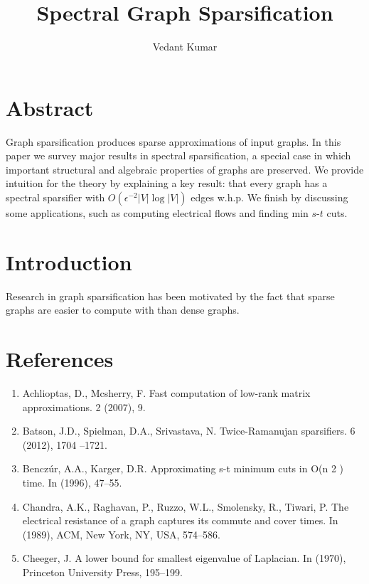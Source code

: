 \documentclass{article}
\title{Spectral Graph Sparsification}
\author{Vedant Kumar}
\begin{document}
\maketitle

\section*{Abstract}

Graph sparsification produces sparse approximations of input graphs.  In
this paper we survey major results in spectral sparsification, a special
case in which important structural and algebraic properties of graphs are
preserved.  We provide intuition for the theory by explaining a key result:
that every graph has a spectral sparsifier with $O(\epsilon^{-2}|V|\log|V|)$
edges w.h.p. We finish by discussing some applications, such as computing
electrical flows and finding min $s$-$t$ cuts.

\section*{Introduction}

Research in graph sparsification has been motivated by the fact that sparse
graphs are easier to compute with than dense graphs. 

\section*{References}

\begin{enumerate}[1.]
    \item Achlioptas, D., Mcsherry, F. Fast computation of low-rank matrix
approximations. 2 (2007), 9.

    \item Batson, J.D., Spielman, D.A., Srivastava, N.  Twice-Ramanujan
sparsifiers. 6 (2012), 1704 –1721.

    \item Benczúr, A.A., Karger, D.R.  Approximating s-t minimum cuts in O(n 2
) time. In (1996), 47–55.

    \item Chandra, A.K., Raghavan, P., Ruzzo, W.L., Smolensky, R., Tiwari, P.
The electrical resistance of a graph captures its commute and cover times. In
(1989), ACM, New York, NY, USA, 574–586.

    \item Cheeger, J. A lower bound for smallest eigenvalue of Laplacian. In
(1970), Princeton University Press, 195–199.
\end{enumerate}
\end{document}
